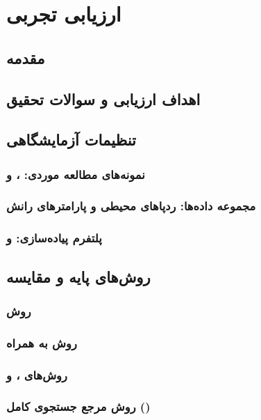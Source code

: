\documentclass[oneside,openany,phd]{TMU-Thesis}
\begin{document}
\newpage

\chapter{ارزیابی تجربی}
\section{مقدمه}

\section{اهداف ارزیابی و سوالات تحقیق}

\section{تنظیمات آزمایشگاهی}
\subsection{نمونه‌های مطالعه موردی: ،  و }
\subsection{مجموعه داده‌ها: ردپاهای محیطی و پارامترهای رانش}
\subsection{پلتفرم پیاده‌سازی:  و }

\section{روش‌های پایه و مقایسه}
\subsection{روش }
\subsection{روش  به همراه }
\subsection{روش‌های ،  و }
\subsection{روش مرجع جستجوی کامل ()}
\end{document}
